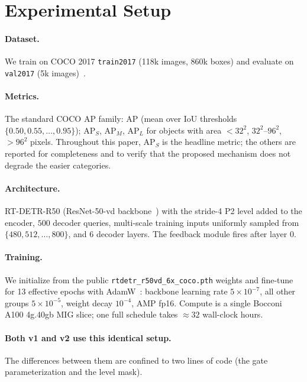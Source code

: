 \section{Experimental Setup}
\label{sec:exp}

\paragraph{Dataset.} We train on COCO 2017 \texttt{train2017} (118k images, 860k boxes) and evaluate on \texttt{val2017} (5k images)~\cite{lin2014coco}.

\paragraph{Metrics.} The standard COCO AP family: $\mathrm{AP}$ (mean over IoU thresholds $\{0.50, 0.55, \ldots, 0.95\}$); $\mathrm{AP}_S$, $\mathrm{AP}_M$, $\mathrm{AP}_L$ for objects with area $<32^2$, $32^2$--$96^2$, $>96^2$ pixels. Throughout this paper, $\mathrm{AP}_S$ is the headline metric; the others are reported for completeness and to verify that the proposed mechanism does not degrade the easier categories.

\paragraph{Architecture.} RT-DETR-R50 (ResNet-50-vd backbone~\cite{he2016resnet}) with the stride-4 P2 level added to the encoder, $500$ decoder queries, multi-scale training inputs uniformly sampled from $\{480, 512, \ldots, 800\}$, and $6$ decoder layers. The feedback module fires after layer $0$.

\paragraph{Training.} We initialize from the public \texttt{rtdetr\_r50vd\_6x\_coco.pth} weights and fine-tune for 13 effective epochs with AdamW~\cite{loshchilov2019adamw}: backbone learning rate $5 \times 10^{-7}$, all other groups $5 \times 10^{-5}$, weight decay $10^{-4}$, AMP fp16. Compute is a single Bocconi A100 \mbox{4g.40gb} MIG slice; one full schedule takes ${\approx}32$ wall-clock hours.

\paragraph{Both v1 and v2 use this identical setup.} The differences between them are confined to two lines of code (the gate parameterization and the level mask).
